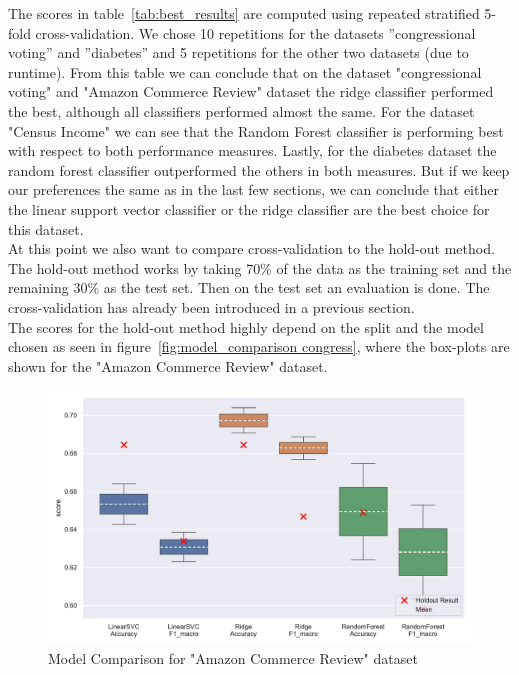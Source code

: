 \documentclass[a4paper,10pt]{article}
\begin{document}
The scores in table~\ref{tab:best_results} are computed using repeated stratified 5-fold
cross-validation. We chose 10 repetitions for the datasets ”congressional voting” and ”diabetes” and 5
repetitions for the other two datasets (due to runtime).
From this table we can conclude that on the dataset "congressional voting" and 
"Amazon Commerce Review" dataset the ridge classifier
performed the best, although all classifiers performed almost the same. For the dataset "Census Income" we can see that
the Random Forest classifier is performing best with respect to both performance measures. Lastly,
for the diabetes dataset the random forest classifier outperformed the others in both measures. But if we keep our preferences the same as in the
last few sections, we can conclude that either the linear support vector classifier or the ridge classifier
are the best choice for this dataset. \\
At this point we also want to compare cross-validation to the hold-out method. 
The hold-out method works by taking 70\% of the data as the training set and the remaining 30\% as the test set.
Then on the test set an evaluation is done. The cross-validation has already been introduced in a previous section.\\
The scores for the hold-out method
highly depend on the split and the model chosen as seen in figure~\ref{fig:model_comparison congress},
where the box-plots are shown for the
"Amazon Commerce Review" dataset.



\begin{figure}[h!]
\centering
\includegraphics[width=\textwidth]{amazon/plots/model_comparison.pdf}
\caption{Model Comparison for "Amazon Commerce Review" dataset}
\label{fig:model_comparison amazon}
\end{figure}
\end{document}
